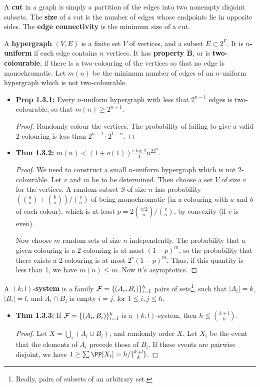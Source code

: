 \documentclass[11pt]{article}
\newenvironment{INT}[1][]{\begin{itemize}\small\item\textbf{#1}}{\end{itemize}}
\begin{document}
\begin{itemise}
\item A \textbf{cut} in a graph is simply a partition of the edges into two nonempty disjoint subsets. The \textbf{size} of a cut is the number of edges whose endpoints lie in opposite sides. The \textbf{edge connectivity} is the minimum size of a cut.
\item A \textbf{hypergraph} $(V,E)$ is a finite set $V$ of vertices, and a subset $E\subset 2^V$. It is \textbf{$n$-uniform} if each edge contains $n$ vertices. It has \textbf{property B}, or is \textbf{two-colourable}, if there is a two-colouring of the vertices so that no edge is monochromatic. Let $m(n)$ be the minimum number of edges of an $n$-uniform hypergraph which is not two-colourable.
\begin{INT}[Prop 1.3.1:]
Every $n$-uniform hypergraph with less that $2^{n-1}$ edges is two-colourable, so that $m(n)\geq 2^{n-1}$.
\begin{proof}
Randomly colour the vertices. The probability of failing to give a valid 2-colouring is less than $2^{n-1}\cdot 2^{1-n}$.
\end{proof}
\item \textbf{Thm 1.3.2:} $m(n)<(1+o(1))\frac{e\log2}{4}n^22^n$.
\begin{proof}
We need to construct a small $n$-uniform hypergraph which is not 2-colourable. Let $v$ and $m$ be to be determined. Then choose a set $V$ of size $v$ for the vertices. A random subset $S$ of size $n$ has probability $({a\choose n}+{b\choose n})/{v\choose n}$ of being monochromatic (in a colouring with $a$ and $b$ of each colour), which is at least $p=2{v/2\choose n}/{v\choose n}$, by convexity (if $v$ is even).

\INDENT Now choose $m$ random sets of size $n$ independently. The probability that a given colouring is a 2-colouring is at most $(1-p)^m$, so the probability that there exists a 2-colouring is at most $2^v(1-p)^m$. Thus, if this quantity is less than 1, we have $m(n)\leq m$. Now it's asymptotics.
\end{proof}
\end{INT}
\item A \textbf{$(k,l)$-system} is a family $\mathcal{F}=\{(A_i,B_i)\}_{i=1}^h$ pairs of sets\footnote{Really, pairs of subsets of an arbitrary set.}, such that $|A_i|=k$, $|B_i|=l$, and $A_i\cap B_j$ is empty \Iff $i=j$, for $1\leq i,j\leq h$.
\begin{INT}[Thm 1.3.3:]
If $\mathcal{F}=\{(A_i,B_i)\}_{i=1}^h$ is a $(k,l)$-system, then $h\leq {k+l\choose k}$.
\begin{proof}
Let $X=\bigcup_i (A_i\cup B_i)$, and randomly order $X$. Let $X_i$ be the event that the elements of $A_i$ precede those of $B_i$. If these events are pairwise disjoint, we have $1\geq \sum \PP[X_i]=h/{k+l\choose k}$.


\end{proof}
\end{INT}
\end{itemise}
\end{document}
